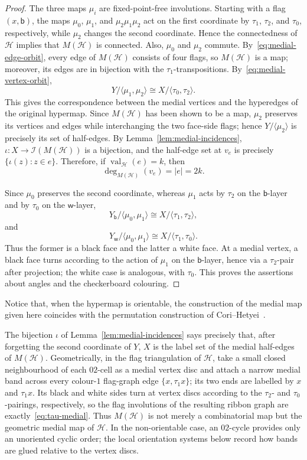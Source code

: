 \documentclass[10pt,a4paper]{article}
\theoremstyle{definition}
\theoremstyle{remark}
\newcommand{\Hcal}{\mathcal{H}}
\newcommand{\val}{\operatorname{val}}
\begin{document}
\begin{proof}
The three maps $\mu_i$ are fixed-point-free involutions. Starting with a flag $(x,\mathsf b)$, the maps $\mu_0$, $\mu_1$, and $\mu_2\mu_1\mu_2$ act on the first coordinate by $\tau_1$, $\tau_2$, and $\tau_0$, respectively, while $\mu_2$ changes the second coordinate. Hence the connectedness of $\Hcal$ implies that $M(\Hcal)$ is connected. Also, $\mu_0$ and $\mu_2$ commute. By~\eqref{eq:medial-edge-orbit}, every edge of $M(\Hcal)$ consists of four flags, so $M(\Hcal)$ is a map; moreover, its edges are in bijection with the $\tau_1$-transpositions. By~\eqref{eq:medial-vertex-orbit},
\[
 Y/\langle\mu_1,\mu_2\rangle
 \cong X/\langle\tau_0,\tau_2\rangle.
\]
This gives the correspondence between the medial vertices and the hyperedges of the original hypermap. Since $M(\Hcal)$ has been shown to be a map, $\mu_2$ preserves its vertices and edges while interchanging the two face-side flags; hence
$Y/\langle\mu_2\rangle$ is precisely its set of half-edges. By Lemma~\ref{lem:medial-incidences}, $\iota:X\to\mathcal I(M(\Hcal))$ is a bijection, and the half-edge set at $v_e$ is precisely $\{\iota(z):z\in e\}$. Therefore, if $\val_{\Hcal}(e)=k$, then
\[
  \deg_{M(\Hcal)}(v_e)=|e|=2k.
\]

Since $\mu_0$ preserves the second coordinate, whereas $\mu_1$ acts by $\tau_2$ on the $\mathsf b$-layer and by $\tau_0$ on the $\mathsf w$-layer,
\[
 Y_{\mathsf b}/\langle\mu_0,\mu_1\rangle
 \cong X/\langle\tau_1,\tau_2\rangle,
\]
and
\[
 Y_{\mathsf w}/\langle\mu_0,\mu_1\rangle
 \cong X/\langle\tau_1,\tau_0\rangle.
\]
Thus the former is a black face and the latter a white face. At a medial vertex, a black face turns according to the action of $\mu_1$ on the $\mathsf b$-layer, hence via a $\tau_2$-pair after projection; the white case is analogous, with $\tau_0$. This proves the assertions about angles and the checkerboard colouring. 
\end{proof}
Notice that, when the hypermap is orientable, the construction of the medial map given here coincides with the permutation construction of Cori--Hetyei~\cite[Definition~3.1]{CoriHetyei2025}.

The bijection $\iota$ of Lemma~\ref{lem:medial-incidences} says precisely that, after forgetting the second coordinate of $Y$, $X$ is the label set of the medial half-edges of $M(\Hcal)$. Geometrically, in the flag triangulation of $\Hcal$, take a small closed neighbourhood of each $02$-cell as a medial vertex disc and attach a narrow medial band across every colour-$1$ flag-graph edge $\{x,\tau_1x\}$; its two ends are labelled by $x$ and $\tau_1x$. Its black and white sides turn at vertex discs according to the $\tau_2$- and $\tau_0$-pairings, respectively, so the flag involutions of the resulting ribbon graph are exactly~\eqref{eq:tau-medial}. Thus $M(\Hcal)$ is not merely a combinatorial map but the geometric medial map of $\Hcal$. In the non-orientable case, an $02$-cycle provides only an unoriented cyclic order; the local orientation systems below record how bands are glued relative to the vertex discs.
\end{document}
